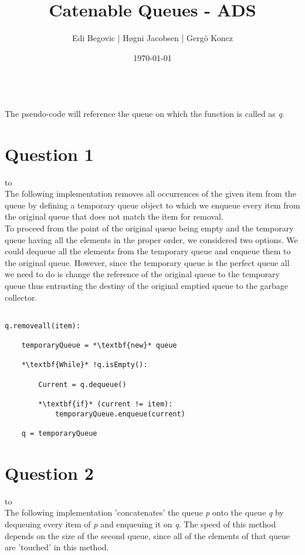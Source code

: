 \documentclass[a4paper]{article}
\title{Catenable Queues - ADS}
\author{Edi Begovic | Høgni Jacobsen | Gergö Koncz}
\date{\today}
\def\headline#1{\hbox to \hsize{\hrulefill\quad\lower.3em\hbox{#1}\quad\hrulefill}}
\begin{document}
 
\maketitle

\ \\
\noindent
The pseudo-code will reference the queue on which the function is called as \textit{q}.
\ \\
\section*{Question 1}
\headline{-} \ \\

\noindent
The following implementation removes all occurrences of the given item from the queue by defining a temporary queue
object to which we enqueue every item from the original queue that does not match the item for removal. 
\ \\

\noindent
To proceed from the point of the original queue being empty and the temporary queue having all the elements in the proper order, we considered two options. We could dequeue all the elements from the temporary queue and enqueue them to the original queue. However, since the temporary queue is the perfect queue all we need to do is change the reference of the original queue to the temporary queue thus entrusting the destiny of the original emptied queue to the garbage collector. 

\noindent
\begin{lstlisting}[escapeinside={{*}{*}}]

q.removeall(item):

    temporaryQueue = *\textbf{new}* queue

    *\textbf{While}* !q.isEmpty():

        Current = q.dequeue()
        
        *\textbf{if}* (current != item):
            temporaryQueue.enqueue(current) 
    
    q = temporaryQueue

\end{lstlisting}

\newpage
\section*{Question 2}
\headline{-} \ \\
The following implementation 'concatenates' the queue \textit{p} onto the queue \textit{q} by
dequeuing every item of \textit{p} and enqueuing it on \textit{q}. The speed of this method depends on the size of the second queue, since all of the elements of that queue are 'touched' in this method.
\ \\
\end{document}
